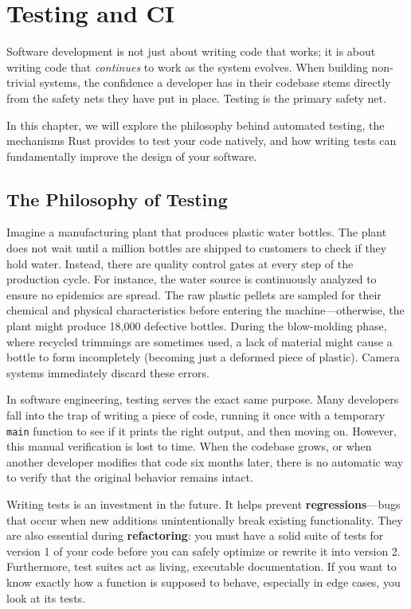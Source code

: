 \chapter{Testing and CI}

Software development is not just about writing code that works; it is about writing code that \textit{continues} to work as the system evolves. When building non-trivial systems, the confidence a developer has in their codebase stems directly from the safety nets they have put in place. Testing is the primary safety net.

In this chapter, we will explore the philosophy behind automated testing, the mechanisms Rust provides to test your code natively, and how writing tests can fundamentally improve the design of your software.

\section{The Philosophy of Testing}

Imagine a manufacturing plant that produces plastic water bottles. The plant does not wait until a million bottles are shipped to customers to check if they hold water. Instead, there are quality control gates at every step of the production cycle. For instance, the water source is continuously analyzed to ensure no epidemics are spread. The raw plastic pellets are sampled for their chemical and physical characteristics before entering the machine---otherwise, the plant might produce 18,000 defective bottles. During the blow-molding phase, where recycled trimmings are sometimes used, a lack of material might cause a bottle to form incompletely (becoming just a deformed piece of plastic). Camera systems immediately discard these errors.

In software engineering, testing serves the exact same purpose. Many developers fall into the trap of writing a piece of code, running it once with a temporary \texttt{main} function to see if it prints the right output, and then moving on. However, this manual verification is lost to time. When the codebase grows, or when another developer modifies that code six months later, there is no automatic way to verify that the original behavior remains intact.

Writing tests is an investment in the future. It helps prevent \textbf{regressions}---bugs that occur when new additions unintentionally break existing functionality. They are also essential during \textbf{refactoring}: you must have a solid suite of tests for version 1 of your code before you can safely optimize or rewrite it into version 2. Furthermore, test suites act as living, executable documentation. If you want to know exactly how a function is supposed to behave, especially in edge cases, you look at its tests.

